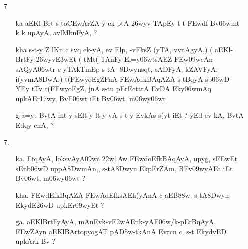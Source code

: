 \def\DevnagVersion{2.15}\documentclass{article}
\begin{document}
\begin{itemize}
 \item[7] \begin{itemize}
          
          \item[\dn ka] {\dn aEKl\? Brt\? s\2-to\3CEwArZA-y ek-ptA\2 \326wyv-TApEy\2 t\? t\? \3FEwd\?f\? Bv\306wmt\? k\? k\? upAyA, avlMbnFyA, {\rs ?\re}} 
          
          \item[\dn kha] {\dn s\2-t-y Z\? l\?Kn\? c sv\0q ek-yA, ev Elp\?, -vFksZ\2 {\rs (\re}yTA{\rs ,\re} v\?vnAgyA\0,{\rs )\re} {\rs (\re}  aEKl{\rs -\re}BrtFy{\rs -\re}\326wyv\3E3wEt {\rs (\re} tMt(-TAnFy{\rs -\re}El=y\306wtsAEZ \3FEw\309wcAn\? sAQyA\306wtr\? c yTAkTmEp s\2-tA{\rs -\re} \38Dwynsqt\?, sADFyA{\rs ,\re} kZA\0VFyA{\rs ,\re} i(y\?vmA\38DwA,{\rs )\re} t(\3FEwyoEgZFnA\2 \3FEwAd\?kBAqAZA\2 s\2-tBqyA s\2b\306wD\2 YEy tT\4v t(\3FEwyoEgZ, jnA s\2-t\?n pErEcttrA EvDA Eky\306wmAq upkAEr\317wy, BvE\306wt iEt Bv\306wt, m\306wy\306wt}
          
          \item[{\dn g}] {\dn a=y\?t BvtA\2 mt y sEl\0t-y lt-y vA s\2-t-y EvkAs\2 s\2(y\4t iEt {\rs ?\re} yEd ev kA, BvtA\2 Edqy\? cnA, {\rs ?\re}}
          \end{itemize}                                         
          
   \item[7.] \begin{itemize}
   
              \item[ka.] {\dn EfqAyA, loks\?vAyA\309wc \322w\?\31Aw\?{\rs ,\re} \3FEwdoEfkBAqAyA, upy\?g, s\2\3FEwEt sEnb\0\306wD uppA\38DwmAn,{\rs ,\re} s\2-tA\38Dwyn\? Ek\2pErZAm, BEv\309wyAEt iEt Bv\306wt, m\306wy\306wt\? {\rs ?\re}}  
              
              \item[kha.] {\dn \3FEwd\?EfkBqAZA\2 \3FEwAd\?EfksAEh(yAnA\2 c aEB\388w\?, s\2-tA\38Dwyn\2 EkydE\326wD upkEr\309wyEt {\rs ?\re} }
              
              \item[ga.] {\dn aEKlBrtFyAyA, mAnEvk{\rs -\re}v\4\3E2wAEnk{\rs -\re}yAE\306w/k{\rs -\re}pErBqAyA, \3FEwZAyn\?{\rs ,\re} aEKlBArtopyogAT\0 pA\3D5w-tkAnA\2 Evrcn\? c{\rs ,\re} s\2-t\2 EkydvED upkArk\2 Bv\? {\rs ?\re} } 
              

\end{itemize}
\end{itemize}
\end{document}
